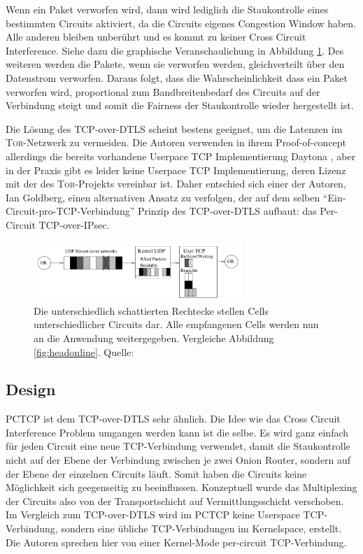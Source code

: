 \documentclass[fleqn,envcountsame,runningheads,10pt,a4paper]{llncs}
\begin{document}
Wenn ein Paket verworfen wird, dann wird lediglich die Staukontrolle eines bestimmten Circuits aktiviert, da die Circuits eigenes Congestion Window haben. Alle anderen bleiben unberührt und es kommt zu keiner Cross Circuit Interference. Siehe dazu die graphische Veranschaulichung in Abbildung \ref{fig:headonlinedtls}. Des weiteren werden die Pakete, wenn sie verworfen werden, gleichverteilt über den Datenstrom verworfen. Daraus folgt, dass die Wahrscheinlichkeit dass ein Paket verworfen wird, proportional zum Bandbreitenbedarf des Circuits auf der Verbindung steigt und somit die Fairness der Staukontrolle wieder hergestellt ist.

Die Lösung des TCP-over-DTLS scheint bestens geeignet, um die Latenzen im \textsc{Tor}-Netzwerk zu vermeiden. Die Autoren verwenden in ihrem Proof-of-concept allerdings die bereits vorhandene Userpace TCP Implementierung Daytona \cite{daytona}, aber in der Praxis gibt es leider keine Userpace TCP  Implementierung, deren Lizenz mit der des \textsc{Tor}-Projekts vereinbar ist. Daher entschied sich einer der Autoren, Ian Goldberg, einen alternativen Ansatz zu verfolgen, der auf dem selben ``Ein-Circuit-pro-TCP-Verbindung'' Prinzip des  TCP-over-DTLS aufbaut: das Per-Circuit TCP-over-IPsec. 

\begin{figure}[h]
  \begin{center}
    \includegraphics[width=0.7\textwidth]{pics/headonlinedtls.pdf}
    \caption{Die unterschiedlich schattierten Rechtecke stellen Cells unterschiedlicher Circuits dar. Alle empfangenen Cells werden nun an die Anwendung weitergegeben. Vergleiche Abbildung \ref{fig:headonline}. Quelle:\cite{tcp-over-dtls}}
    \label{fig:headonlinedtls} 
  \end{center} 
\end{figure} 

\subsection{Design}

PCTCP ist dem TCP-over-DTLS sehr ähnlich. Die Idee wie das Cross Circuit Interference Problem umgangen werden kann ist die selbe. Es wird ganz einfach für jeden Circuit eine neue TCP-Verbindung verwendet, damit die Staukontrolle nicht auf der Ebene der Verbindung zwischen je zwei Onion Router, sondern auf der Ebene der einzelnen Circuits läuft. Somit haben die Circuits keine Möglichkeit sich geegenseitig zu beeinflussen. Konzeptuell wurde das Multiplexing der Circuits also von der Transportschicht auf Vermittlungsschicht verschoben. Im Vergleich zum TCP-over-DTLS wird im PCTCP keine Userspace TCP-Verbindung, sondern eine übliche TCP-Verbindungen im Kernelspace, erstellt. Die Autoren sprechen hier von einer Kernel-Mode per-circuit TCP-Verbindung. 
\end{document}

